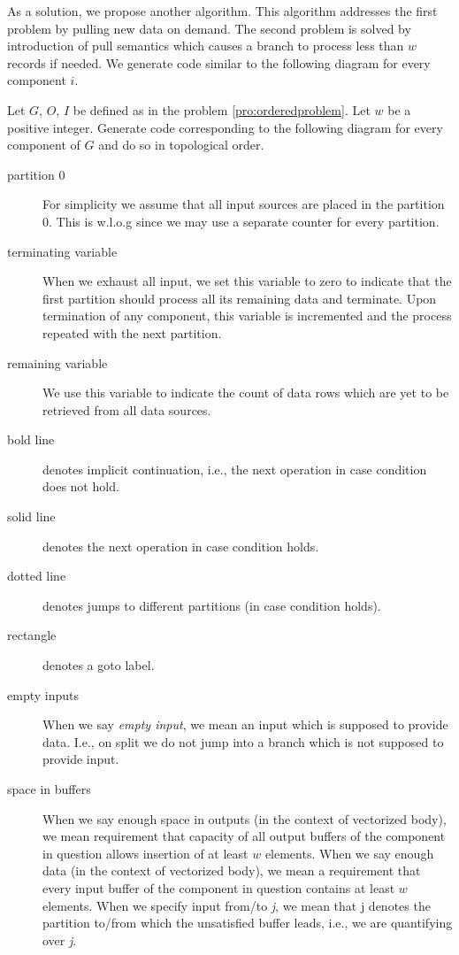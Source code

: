 As a solution, we propose another algorithm. This algorithm addresses the first problem by pulling new data on demand. The second problem is solved by introduction of pull semantics which causes a branch to process less than $w$ records if needed. We generate code similar to the following diagram for every component $i$.

  Let $G$, $O$, $I$ be defined as in the problem \ref{pro:orderedproblem}. Let $w$ be a positive integer. Generate code corresponding to the following diagram for every component of $G$ and do so in topological order.
\begin{description}
 \item[partition 0] For simplicity we assume that all input sources are placed in the partition 0. This is w.l.o.g since we may use a separate counter for every partition. 
  \item[terminating variable] When we exhaust all input, we set this variable to zero to indicate that the first partition should process all its remaining data and terminate. Upon termination of any component, this variable is incremented and the process repeated with the next partition.
  \item[remaining variable] We use this variable to indicate the count of data rows which are yet to be retrieved from all data sources. 
  \item[bold line] denotes implicit continuation, i.e., the next operation in case condition does not hold. 
  \item[solid line] denotes the next operation in case condition holds.
  \item[dotted line] denotes jumps to different partitions (in case condition holds).
  \item[rectangle] denotes a goto label.
 \item[empty inputs] When we say \emph{empty input}, we mean an input which is supposed to provide data. I.e., on split we do not jump into a branch which is not supposed to provide input.
  \item[space in buffers] When we say enough space in outputs (in the context of vectorized body), we mean requirement that capacity of all output buffers of the component in question allows insertion of at least $w$ elements. When we say enough data (in the context of vectorized body), we mean a requirement that every input buffer of the component in question contains at least $w$ elements. When we specify input from/to \emph{j}, we mean that j denotes the partition to/from which the unsatisfied buffer leads, i.e., we are quantifying over \emph{j}.

\end{description}

